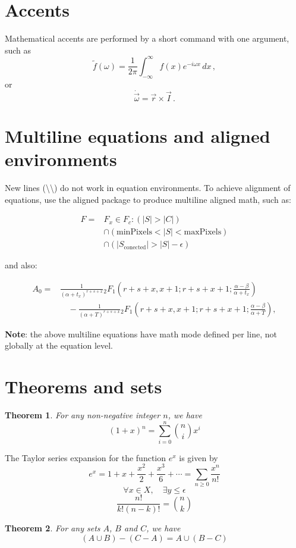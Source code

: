\section{Accents}
Mathematical accents are performed by a short command with one
argument, such as
\[
    \tilde f(\omega)=\frac{1}{2\pi}
    \int_{-\infty}^\infty f(x)e^{-i\omega x}\,dx\,,
\]
or
\[
    \dot{\vec \omega}=\vec r\times\vec I\,.
\]

\section{Multiline equations and aligned environments}

New lines (\textbackslash \textbackslash) do not work in equation environments. To achieve alignment of equations, use the aligned  package to produce multiline aligned math, such as:

\begin{center}
    \begin{align}
        F = & F_{x} \in  F_{c} : (|S| > |C|)                        \\
            & \cap (\mathrm{minPixels}  < |S| < \mathrm{maxPixels}) \\
            & \cap (|S_{\mathrm{conected}}| > |S| - \epsilon)
    \end{align}
\end{center}

and also:
\newline
\begin{center}
    \begin{align}
        A_0 = & \frac{1}{(\alpha+t_x)^{r+s+x}}{}_2 F_1\left( r+s+x,x+1;r+s+x+1;\frac{\alpha-\beta}{\alpha + t_x} \right)      \\
              & \quad - \frac{1}{(\alpha+T)^{r+s+x}}{}_2 F_1\left( r+s+x,x+1;r+s+x+1;\frac{\alpha-\beta}{\alpha + T} \right),
    \end{align}
\end{center}

\textbf{Note}: the above multiline equations have math mode defined per line, not globally at the equation level.

\section{Theorems and sets}
\newtheorem{theorem}{Theorem}
\newtheorem{corollary}[theorem]{Corollary}
\newtheorem{lemma}[theorem]{Lemma}
\newtheorem{definition}[theorem]{Definition}
\begin{theorem}
    For any non-negative integer ${n}$, we have
    $${(1+x)^{n} = \sum_{i=0}^{n} {n \choose i} x^i}$$
\end{theorem}
The Taylor series expansion for the function ${e^x}$ is given by
\begin{equation}
    e^x = 1 + x + \frac{x^2}{2} + \frac{x^3}{6} + \cdots = \sum_{n\geq 0} \frac{x^n}{n!}
\end{equation}
\[ \forall x \in X, \quad \exists y \leq \epsilon \]
\[ \frac{n!}{k!(n-k)!} = \binom{n}{k} \]
\begin{theorem}
    For any sets ${A}$, ${B}$ and ${C}$, we have
    $${(A\cup B)-(C-A) = A \cup (B-C)}$$
\end{theorem}
